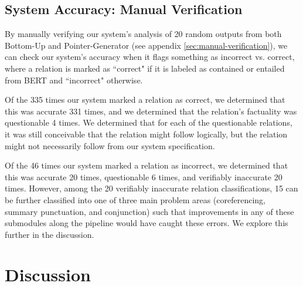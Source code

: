 \documentclass{article}
\begin{document}

\subsection{System Accuracy: Manual Verification}

By manually verifying our system's analysis of 20 random outputs from both Bottom-Up and Pointer-Generator (see appendix \ref{sec:manual-verification}), we can check our system's accuracy when it flags something as incorrect vs. correct, where a relation is marked as ``correct" if it is labeled as contained or entailed from BERT and ``incorrect" otherwise.

Of the 335 times our system marked a relation as correct, we determined that this was accurate 331 times, and we determined that the relation's factuality was questionable 4 times. We determined that for each of the questionable relations, it was still conceivable that the relation might follow logically, but the relation might not necessarily follow from our system specification.

Of the 46 times our system marked a relation as incorrect, we determined that this was accurate 20 times, questionable 6 times, and verifiably inaccurate 20 times. However, among the 20 verifiably inaccurate relation classifications, 15 can be further classified into one of three main problem areas (coreferencing, summary punctuation, and conjunction) such that improvements in any of these submodules along the pipeline would have caught these errors. We explore this further in the discussion.

\section{Discussion}
\label{sec:discussion}

\end{document}
